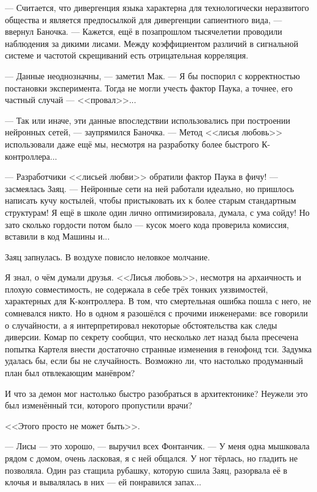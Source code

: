 --- Считается, что дивергенция языка характерна для технологически неразвитого общества и является предпосылкой для дивергенции сапиентного вида, --- ввернул Баночка.
--- Кажется, ещё в позапрошлом тысячелетии проводили наблюдения за дикими лисами.
Между коэффициентом различий в сигнальной системе и частотой скрещиваний есть отрицательная корреляция.

--- Данные неоднозначны, --- заметил Мак.
--- Я бы поспорил с корректностью постановки эксперимента.
Тогда не могли учесть фактор Паука, а точнее, его частный случай --- <<провал>>...

--- Так или иначе, эти данные впоследствии использовались при построении нейронных сетей, --- заупрямился Баночка.
--- Метод <<лисья любовь>> использовали даже ещё мы, несмотря на разработку более быстрого К-контроллера...

--- Разработчики <<лисьей любви>> обратили фактор Паука в фичу! --- засмеялась Заяц.
--- Нейронные сети на ней работали идеально, но пришлось написать кучу костылей, чтобы пристыковать их к более старым стандартным структурам!
Я ещё в школе один лично оптимизировала, думала, с ума сойду!
Но зато сколько гордости потом было --- кусок моего кода проверила комиссия, вставили в код Машины и...

Заяц запнулась.
В воздухе повисло неловкое молчание.

Я знал, о чём думали друзья.
<<Лисья любовь>>, несмотря на архаичность и плохую совместимость, не содержала в себе трёх тонких уязвимостей, характерных для К-контроллера.
В том, что смертельная ошибка пошла с него, не сомневался никто.
Но в одном я разошёлся с прочими инженерами: все говорили о случайности, а я интерпретировал некоторые обстоятельства как следы диверсии.
Комар по секрету сообщил, что несколько лет назад была пресечена попытка Картеля внести достаточно странные изменения в генофонд тси.
Задумка удалась бы, если бы не случайность.
Возможно ли, что настолько продуманный план был отвлекающим манёвром?

И что за демон мог настолько быстро разобраться в архитектонике?
Неужели это был изменённый тси, которого пропустили врачи?

<<Этого просто не может быть>>.

--- Лисы --- это хорошо, --- выручил всех Фонтанчик.
--- У меня одна мышковала рядом с домом, очень ласковая, я с ней общался.
У ног тёрлась, но гладить не позволяла.
Один раз стащила рубашку, которую сшила Заяц, разорвала её в клочья и вывалялась в них --- ей понравился запах...

